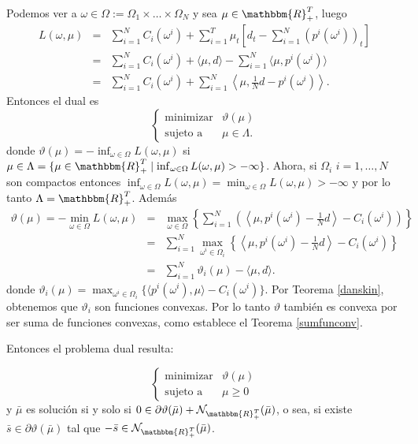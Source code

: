\documentclass[a4paper,12pt]{report}
\newcommand{\la}{\langle}
\newcommand{\ra}{\rangle}
\newcommand{\lla}{\left\la}
\newcommand{\rra}{\right\ra}
\newcommand{\RR}{\mathbbm{R}}
\newcommand{\vth}{\vartheta}
\newcommand{\om}{\omega}
\newcommand{\bmu}{\bar{\mu}}
\newcommand{\cN}{\mathcal{N}}
\begin{document}
Podemos ver a $\om\in\Omega:=\Omega_1\times\dots\times\Omega_N$ y sea $\mu\in\RR_{+}^T$, luego
\begin{eqnarray*}
L(\om,\mu)&=&\sum_{i=1}^N C_i(\om^i)+\sum_{i=1}^{T}\mu_t\left[ d_t-\sum_{i=1}^N(p^i(\om^i))_t\right]\\
&=&\sum_{i=1}^N C_i(\om^i)+\la \mu,d\ra - \sum_{i=1}^N\la\mu,p^i(\om^i)\ra\\
&=&\sum_{i=1}^N C_i(\om^i)+\sum_{i=1}^{N}\lla \mu,\frac{1}{N}d-p^i(\om^i)\rra.
\end{eqnarray*}
Entonces el dual es
\begin{equation}\label{problemadual1}
\left\{
 \begin{array}{rl}
 \mathop\mathrm{minimizar} & \vth(\mu)\\
  \mbox{sujeto a}& \mu\in\Lambda.
 \end{array}
\right.
\end{equation}
donde $\vth(\mu)=-\inf_{\omega\in \Omega}L(\omega,\mu)$ si $\mu\in\Lambda=\{\mu\in\RR_+^T \mid\inf_{\omega \in \Omega}L(\omega,\mu)>-\infty\}$.
Ahora, si $\Omega_i$ $i=1,\ldots,N$ son compactos entonces $\inf_{\om\in\Omega}L(\om,\mu)=\min_{\om\in\Omega}L(\om,\mu)>-\infty$ y por lo tanto $\Lambda=\RR_+^T$. Adem\'as
\begin{eqnarray}
\vth(\mu)=-\min_{\om\in\Omega}L(\om,\mu)&=&\max_{\om\in\Omega}\left\{\sum_{i=1}^{N}\left(\lla \mu,p^i(\om^i)-\frac{1}{N}d\rra - C_i(\om^i)\right)\right\}\nonumber\\
&=&\sum_{i=1}^{N}\max_{\om^i\in\Omega_i}\left\{\lla \mu,p^i(\om^i)-\frac{1}{N}d\rra - C_i(\om^i)\right\}\nonumber\\
&=&\sum_{i=1}^{N}\vth_i(\mu)-\la \mu,d\ra. \label{vthetai}
\end{eqnarray}
donde $\vartheta_i(\mu)=\max_{\om^i\in\Omega_i}\{\la p^i(\om^i),\mu\ra-C_i(\om^i)\}$. Por Teorema \ref{danskin}, obtenemos que $\vartheta_i$ son funciones convexas. Por lo tanto $\vartheta$ tambi\'en es convexa por ser suma de funciones convexas, como establece el Teorema \ref{sumfunconv}.

Entonces el problema dual resulta:

\begin{equation}\label{problemadual2}
\left\{
 \begin{array}{rl}
\mathop\mathrm{minimizar} & \vth(\mu)\\
  \mbox{sujeto a}& \mu\geq 0
 \end{array}
\right.
\end{equation}
y $\bar{\mu}$ es soluci\'on si y solo si $0\in\partial\vth(\bar{\mu})+\cN_{\RR_{+}^T}(\bar{\mu})$, o sea, si existe $\bar{s}\in\partial\vth(\bar{\mu})$ tal que $-\bar{s}\in\cN_{\RR_{+}^T}(\bmu)$.
\end{document}
